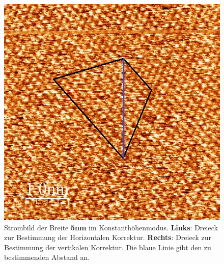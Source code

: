 \documentclass[12pt,a4paper]{article}
\begin{document}
\begin{figure}[H]
\includegraphics[scale=0.36]{Bilder/Atome/hoch5_v.jpg}
\caption{Strombild der Breite \textbf{5nm} im Konstanthöhenmodus. \textbf{Links}: Dreieck zur Bestimmung der Horizontalen Korrektur. \textbf{Rechts}: Dreieck zur Bestimmung der vertikalen Korrektur. Die blaue Linie gibt den zu bestimmenden Abstand an.}
\end{figure}
\end{document}
